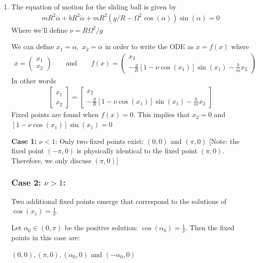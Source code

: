 \begin{solution}[3.2]
	\leavevmode
\begin{enumerate}
\item The equation of motion for the sliding ball is given by
\begin{align}
	mR^2 \ddot{\alpha} + bR^2 \dot{\alpha} + mR^2(g/R - \Omega^2 \cos (\alpha))\sin (\alpha) = 0
\end{align}
Where we'll define $\nu = R\Omega^2 /g$

We can define $x_1 = \alpha, \,\, x_2 = \dot{\alpha}$ in order to write the ODE as $\dot{x} = f(x)$ where
\begin{align}
	x = \begin{pmatrix}
		x_1 \\
		x_2
	\end{pmatrix}
	\qquad \text{and} \qquad f(x) = \begin{pmatrix}
		x_2 \\
		-\displaystyle \frac{g}{R}[1-\nu \cos (x_1)]\sin (x_1) - \frac{b}{m} x_2
	\end{pmatrix}
\end{align}
In other words
\begin{align}
	\begin{bmatrix}
		\dot{x_1} \\
		\dot{x_2}
	\end{bmatrix} = \begin{bmatrix}
		x_2 \\
		-\displaystyle \frac{g}{R}[1-\nu \cos (x_1)]\sin (x_1) - \frac{b}{m} x_2
	\end{bmatrix}
\end{align}
Fixed points are found when $f(x)=0$. This implies that $ x_2 =0$ and $[1-\nu \cos (x_1)]\sin (x_1)=0$

\textbf{Case 1:} $\nu <1$:
Only two fixed points exist: $(0,0)$ and $(\pi,0)$ [Note: the fixed point $(-\pi,0)$ is physically identical to the fixed point $(\pi,0)$. Therefore, we only discuss $(\pi,0)$]

\subsubsection*{Case 2: $\nu >1$:}
Two additional fixed points emerge that correspond to the solutions of $\cos(x_1) = \frac{1}{\nu}$.

Let $\alpha_0 \in (0,\pi)$ be the positive solution: $\cos(\alpha_0) = \frac{1}{\nu}$. Then the fixed points in this case are: 

$(0,0),(\pi,0),(\alpha_0,0)$ and $(-\alpha_0,0)$


\end{enumerate}
\end{solution}
